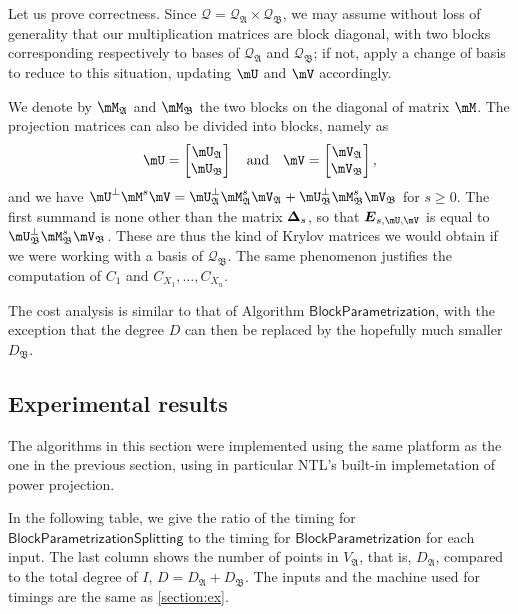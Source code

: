 \documentclass[12pt]{article}
\newcommand{\mat}[1]{\bm{\MakeUppercase{#1}}} %
\newcommand{\mainalgoname}{\mathsf{ BlockParametrization}}
\newcommand{\residueI}{\mathscr{Q}}
\begin{document}
Let us prove correctness. Since $\residueI=\residueI_\mathfrak{A}
\times \residueI_\mathfrak{B}$, we may assume without loss of
generality that our multiplication matrices are block diagonal, with
two blocks corresponding respectively to bases of $\residueI_\mathfrak{A}$
and $\residueI_\mathfrak{B}$; if not, apply a change of basis to 
reduce to this situation, updating $\mU$ and $\mV$ accordingly. 

We denote by $\mM_\mathfrak{A}$ and $\mM_\mathfrak{B}$ the 
two blocks on the diagonal of matrix $\mM$.
The projection matrices can also be divided into blocks, namely as
$$\mU = \left [\begin{matrix}\mU_\mathfrak{A} \\\mU_\mathfrak{B}
  \end{matrix}\right ] \quad\text{and}\quad
\mV = \left [\begin{matrix}\mV_\mathfrak{A} \\\mV_\mathfrak{B}
  \end{matrix}\right ],$$
and we have $\mU^\perp \mM^s \mV = \mU_\mathfrak{A}^\perp
\mM_\mathfrak{A}^s \mV_\mathfrak{A} + \mU_\mathfrak{B}^\perp
\mM_\mathfrak{B}^s \mV_\mathfrak{B}$ for $s \ge 0$. The first summand
is none other than the matrix $\mat{\Delta}_s$, so that
$\mat{E}_{s,\mU,\mV}$ is equal to $\mU_\mathfrak{B}^\perp
\mM_\mathfrak{B}^s \mV_\mathfrak{B}$. These are thus the kind of
Krylov matrices we would obtain if we were working with a basis of
$\residueI_\mathfrak{B}$. The same phenomenon justifies the 
computation of $C_1$ and $C_{X_1},\dots,C_{X_n}$.

The cost analysis is similar to that of Algorithm $\mainalgoname$,
with the exception that the degree $D$ can then be replaced by the
hopefully much smaller $D_\mathfrak{B}$.


\subsection{Experimental results}

The algorithms in this section were implemented using the same
platform as the one in the previous section, using in particular NTL's
built-in implemetation of power projection.

In the following table, we give the ratio of the timing for
$\mathsf{BlockParametrizationSplitting}$ to the timing for
$\mainalgoname$ for each input.  The last column shows the number of
points in $V_\mathfrak{A}$, that is, $D_\mathfrak{A}$, compared to the
total degree of $I$, $D=D_\mathfrak{A}+D_\mathfrak{B}$. The inputs and
the machine used for timings are the same as \cref{section:ex}.
\end{document}
